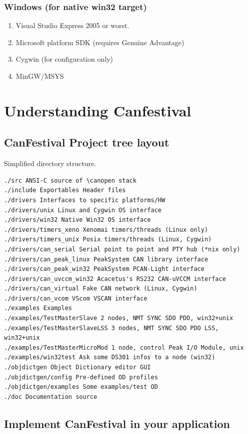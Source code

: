 \documentclass[12pt,english,a4paper]{book}
\newcommand{\canopen}{CANopen }
\begin{document}
\subsubsection{Windows (for native win32 target)}

\begin{enumerate}
\item Visual Studio Express 2005 or worst.
\item Microsoft platform SDK (requires Genuine Advantage)
\item Cygwin (for configuration only)
\item MinGW/MSYS
\end{enumerate}

\section{Understanding Canfestival}

\subsection{CanFestival Project tree layout}
Simplified directory structure.
\begin{verbatim}
./src ANSI-C source of \canopen stack
./include Exportables Header files
./drivers Interfaces to specific platforms/HW
./drivers/unix Linux and Cygwin OS interface
./drivers/win32 Native Win32 OS interface
./drivers/timers_xeno Xenomai timers/threads (Linux only)
./drivers/timers_unix Posix timers/threads (Linux, Cygwin)
./drivers/can_serial Serial point to point and PTY hub (*nix only)
./drivers/can_peak_linux PeakSystem CAN library interface
./drivers/can_peak_win32 PeakSystem PCAN-Light interface
./drivers/can_uvccm_win32 Acacetus's RS232 CAN-uVCCM interface
./drivers/can_virtual Fake CAN network (Linux, Cygwin)
./drivers/can_vcom VScom VSCAN interface
./examples Examples
./examples/TestMasterSlave 2 nodes, NMT SYNC SDO PDO, win32+unix
./examples/TestMasterSlaveLSS 3 nodes, NMT SYNC SDO PDO LSS, win32+unix
./examples/TestMasterMicroMod 1 node, control Peak I/O Module, unix
./examples/win32test Ask some DS301 infos to a node (win32)
./objdictgen Object Dictionary editor GUI
./objdictgen/config Pre-defined OD profiles
./objdictgen/examples Some examples/test OD
./doc Documentation source
\end{verbatim}



\subsection{Implement CanFestival in your application}
\end{document}
